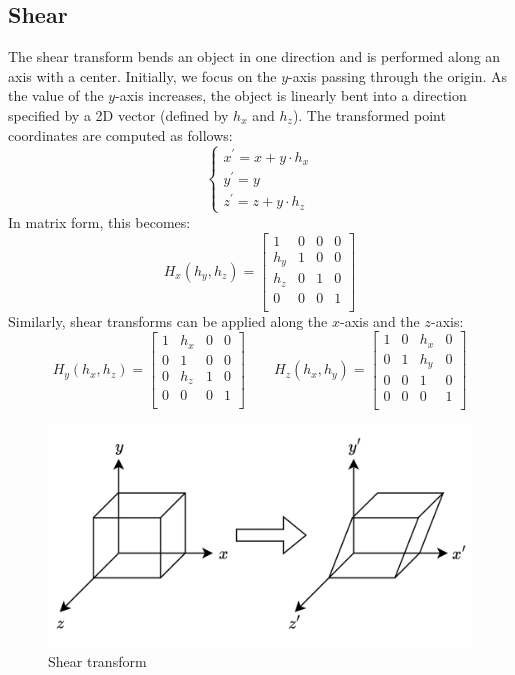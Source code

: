 \subsection{Shear}
The shear transform bends an object in one direction and is performed along an axis with a center. 
Initially, we focus on the $y$-axis passing through the origin.
As the value of the $y$-axis increases, the object is linearly bent into a direction specified by a 2D vector (defined by $h_x$ and $h_z$).
The transformed point coordinates are computed as follows:
\[\begin{cases}
    x^\prime = x + y \cdot h_x \\
    y^\prime = y \\
    z^\prime = z + y \cdot h_z
\end{cases}\]
In matrix form, this becomes:
\[H_x(h_y,h_z)=
\begin{bmatrix}
    1   & 0   & 0   & 0 \\
    h_y   & 1   & 0   & 0 \\
    h_z   & 0   & 1   & 0 \\
    0   & 0   & 0   & 1 \\
\end{bmatrix}\]
Similarly, shear transforms can be applied along the $x$-axis and the $z$-axis:
\[H_y(h_x,h_z)=
\begin{bmatrix}
    1   & h_x   & 0   & 0 \\
    0   & 1   & 0   & 0 \\
    0   & h_z   & 1   & 0 \\
    0   & 0   & 0   & 1 \\
\end{bmatrix}
\qquad 
H_z(h_x,h_y)=
\begin{bmatrix}
    1   & 0   & h_x   & 0 \\
    0   & 1   & h_y   & 0 \\
    0   & 0   & 1   & 0 \\
    0   & 0   & 0   & 1 \\
\end{bmatrix}\]

\begin{figure}[H]
    \centering
    \includegraphics[width=0.65\linewidth]{images/shear.png}
    \caption{Shear transform}
\end{figure}

